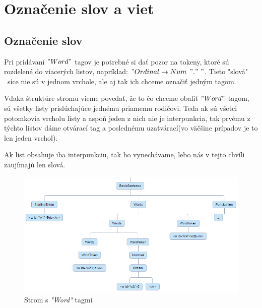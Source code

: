 \documentclass[12pt,a4paper]{report}
\theoremstyle{definition}
\theoremstyle{remark}
\begin{document}
\section{Označenie slov a viet}
\subsection{Označenie slov}
Pri pridávaní $"Word"$ tagov je potrebné si dať pozor na tokeny, ktoré sú rozdelené do viacerých listov, napríklad: $"Ordinal \to Num $ $ "." \ "$. Tieto "slová"  \ síce nie sú v jednom vrchole, ale aj tak ich chceme označiť jedným tagom.

Vďaka štruktúre stromu vieme povedať, že to čo chceme obaliť $"Word"$ tagom, sú všetky listy prislúchajúce jednému priamemu rodičovi. Teda ak sú všetci potomkovia vrcholu listy a aspoň jeden z nich nie je interpunkcia, tak prvému z týchto listov dáme otvárací tag a poslednému uzatvárací(vo väčšine prípadov je to len jeden vrchol).


Ak list obsahuje iba interpunkciu, tak ho vynechávame, lebo nás v tejto chvíli zaujímajú len slová.

\begin{figure}[H]
\centering
\includegraphics[scale=2.2]{treeWordsAdded}
\caption{Strom s \textit{"Word"} tagmi}
\end{figure}
\end{document}
